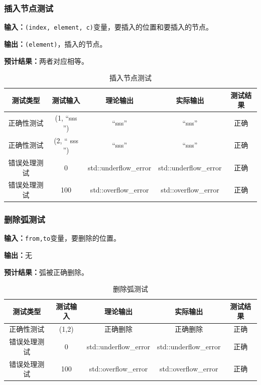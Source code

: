 \subsubsection{插入节点测试}
\textbf{输入：}\texttt{(index, element, c)}变量，要插入的位置和要插入的节点。
\par
\textbf{输出：}\texttt{(element)}，插入的节点。
\par
\textbf{预计结果：}两者对应相等。
\begin{table}[h]
    \centering
    \caption{插入节点测试}
    \begin{tabular}{@{}ccccc@{}}
        \toprule
        \multicolumn{1}{c}{测试类型}    & \multicolumn{1}{c}{测试输入} & \multicolumn{1}{c}{理论输出} & \multicolumn{1}{c}{实际输出} &
        \multicolumn{1}{c}{测试结果} \\ \midrule
        \multicolumn{1}{c|}{正确性测试}  & (1, ``sss '')&``sss''& ``sss''&正确\\
        \multicolumn{1}{c|}{正确性测试}  & (2, `` sss '')&``sss''& ``sss''&正确\\
        \multicolumn{1}{c|}{错误处理测试} & 0& std::underflow\_error& std::underflow\_error& 正确\\
        \multicolumn{1}{c|}{错误处理测试} & 100& std::overflow\_error& std::overflow\_error& 正确\\ \bottomrule
    \end{tabular}
    \label{tab:inserttest4}
\end{table}


\subsubsection{删除弧测试}
\textbf{输入：}\texttt{from,to}变量，要删除的位置。
\par
\textbf{输出：}无
\par
\textbf{预计结果：}弧被正确删除。
\begin{table}[h]
    \centering
    \caption{删除弧测试}
    \begin{tabular}{@{}ccccc@{}}
        \toprule
        \multicolumn{1}{c}{测试类型}    & \multicolumn{1}{c}{测试输入} & \multicolumn{1}{c}{理论输出} & \multicolumn{1}{c}{实际输出} &
        \multicolumn{1}{c}{测试结果} \\ \midrule
        \multicolumn{1}{c|}{正确性测试}  & (1,2)&正确删除&正确删除&正确\\
        \multicolumn{1}{c|}{错误处理测试} & 0& std::underflow\_error& std::underflow\_error& 正确\\
        \multicolumn{1}{c|}{错误处理测试} & 100& std::overflow\_error& std::overflow\_error& 正确\\ \bottomrule
    \end{tabular}
    \label{tab:deletetest4}
\end{table}


